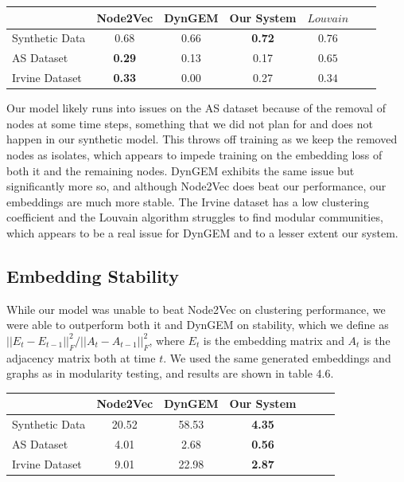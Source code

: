 \documentclass[12pt,twoside]{report}
\begin{document}
\begin{center}
\begin{tabular}{l*{5}{c}r}
              & Node2Vec & DynGEM & Our System & $Louvain$ \\
\hline
Synthetic Data    & 0.68 & 0.66 & \textbf{0.72} & $0.76$  \\
AS Dataset   & \textbf{0.29} & 0.13 & 0.17 & $0.65$  \\
Irvine Dataset   & \textbf{0.33} & 0.00 & 0.27 & $0.34$  \\
\end{tabular}
\end{center} 

Our model likely runs into issues on the AS dataset because of the removal of nodes at some time steps, something that we did not plan for and does not happen in our synthetic model. This throws off training as we keep the removed nodes as isolates, which appears to impede training on the embedding loss of both it and the remaining nodes. DynGEM exhibits the same issue but significantly more so, and although Node2Vec does beat our performance, our embeddings are much more stable. The Irvine dataset has a low clustering coefficient and the Louvain algorithm struggles to find modular communities, which appears to be a real issue for DynGEM and to a lesser extent our system. \\

\subsection{Embedding Stability}

While our model was unable to beat Node2Vec on clustering performance, we were able to outperform both it and DynGEM on stability, which we define as $|| E_t - E_{t-1}||^2_F / ||A_t - A_{t-1}||^2_F$, where $E_t$ is the embedding matrix and $A_t$ is the adjacency matrix both at time $t$. We used the same generated embeddings and graphs as in modularity testing, and results are shown in table 4.6. \\

\begin{center}
\begin{tabular}{l*{5}{c}r}
              & Node2Vec & DynGEM & Our System \\
\hline
Synthetic Data    & 20.52 & 58.53 & \textbf{4.35}  \\
AS Dataset   & 4.01 & 2.68 & \textbf{0.56}  \\
Irvine Dataset   & 9.01 & 22.98 & \textbf{2.87}  \\
\end{tabular}
\end{center} 
\end{document}
